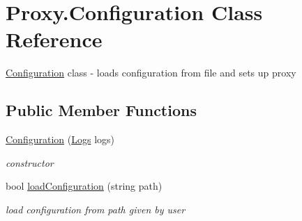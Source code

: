 \hypertarget{class_proxy_1_1_configuration}{}\section{Proxy.\+Configuration Class Reference}
\label{class_proxy_1_1_configuration}


\hyperlink{class_proxy_1_1_configuration}{Configuration} class -\/ loads configuration from file and sets up proxy  


\subsection*{Public Member Functions}
\begin{DoxyCompactItemize}
\item 
\hyperlink{class_proxy_1_1_configuration_a787573e329991bc11d635b26ea76973f}{Configuration} (\hyperlink{class_proxy_1_1_logs}{Logs} logs)
\begin{DoxyCompactList}\small\item\em constructor \end{DoxyCompactList}\item 
bool \hyperlink{class_proxy_1_1_configuration_aa7f64abf59b773c8f9dda364fa069e39}{load\+Configuration} (string path)
\begin{DoxyCompactList}\small\item\em load configuration from path given by user \end{DoxyCompactList}\end{DoxyCompactItemize}
